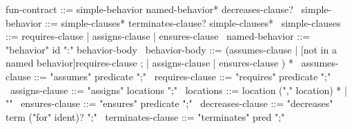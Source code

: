 \begin{syntax}
  fun-contract ::= simple-behavior named-behavior* decreases-clause?
  \
  simple-behavior ::= simple-clauses* terminates-clause? simple-clauses*
  \
  simple-clauses ::= requires-clause | assigns-clause | ensures-clause
  \
  named-behavior ::= "behavior" id ":" behavior-body
  \
  behavior-body ::= (assumes-clause |
                     {[not in a named behavior]requires-clause} ;
                    | assigns-clause | ensures-clause ) *
              \
  assumes-clause ::= "assumes" predicate ";"
  \
  requires-clause ::= "requires" predicate ";"
  \
  assigns-clause ::= "assigns" locations ";"
  \
  locations ::= location ("," location) * | "\nothing"
  \
  ensures-clause ::= "ensures" predicate ";"
  \
  decreases-clause ::= "decreases" term ("for" ident)? ";"
  \
  terminates-clause ::= "terminates" pred ";"
\end{syntax}
